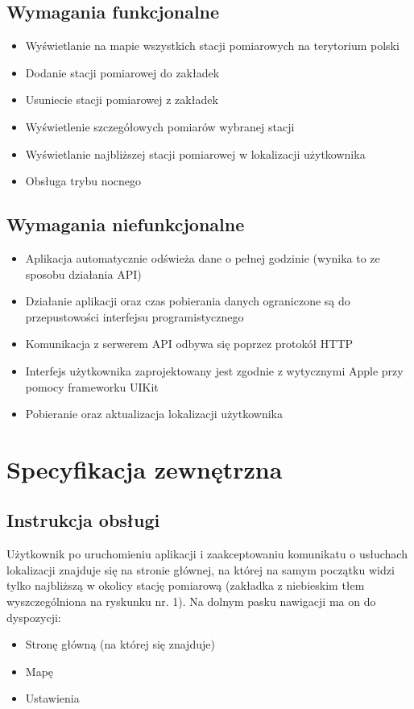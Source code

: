 \documentclass[a4paper,11pt,titlepage]{article}
\begin{document}
\subsection{Wymagania funkcjonalne}
\begin{itemize}
 	\item Wyświetlanie na mapie wszystkich stacji pomiarowych na terytorium polski
  	\item Dodanie stacji pomiarowej do zakładek
  	\item Usuniecie stacji pomiarowej z zakładek
	\item Wyświetlenie szczegółowych pomiarów wybranej stacji
	\item Wyświetlanie najbliższej stacji pomiarowej w lokalizacji użytkownika
	\item Obsługa trybu nocnego
\end{itemize}
\subsection{Wymagania niefunkcjonalne}
\begin{itemize}
 	\item Aplikacja automatycznie odświeża dane o pełnej godzinie (wynika to ze sposobu działania API)
	\item Działanie aplikacji oraz czas pobierania danych ograniczone są do przepustowości interfejsu programistycznego
	\item Komunikacja z serwerem API odbywa się poprzez protokół HTTP
	\item Interfejs użytkownika zaprojektowany jest zgodnie z wytycznymi Apple przy pomocy frameworku UIKit
	\item Pobieranie oraz aktualizacja lokalizacji użytkownika
\end{itemize}

\section{Specyfikacja zewnętrzna}
\subsection{Instrukcja obsługi}
Użytkownik po uruchomieniu aplikacji i zaakceptowaniu komunikatu o usłuchach lokalizacji znajduje się na stronie głównej, na której na samym początku widzi tylko najbliższą w okolicy stację pomiarową (zakładka z niebieskim tłem wyszczególniona na ryskunku nr. 1). Na dolnym pasku nawigacji ma on do dyspozycji:
\begin{itemize}
 	\item Stronę główną (na której się znajduje)
	\item Mapę
	\item Ustawienia
\end{itemize}
\end{document}
